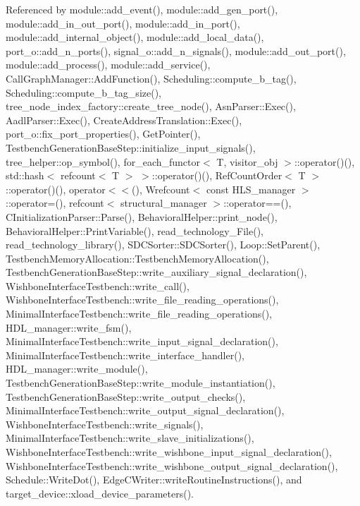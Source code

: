 Referenced by module\+::add\+\_\+event(), module\+::add\+\_\+gen\+\_\+port(), module\+::add\+\_\+in\+\_\+out\+\_\+port(), module\+::add\+\_\+in\+\_\+port(), module\+::add\+\_\+internal\+\_\+object(), module\+::add\+\_\+local\+\_\+data(), port\+\_\+o\+::add\+\_\+n\+\_\+ports(), signal\+\_\+o\+::add\+\_\+n\+\_\+signals(), module\+::add\+\_\+out\+\_\+port(), module\+::add\+\_\+process(), module\+::add\+\_\+service(), Call\+Graph\+Manager\+::\+Add\+Function(), Scheduling\+::compute\+\_\+b\+\_\+tag(), Scheduling\+::compute\+\_\+b\+\_\+tag\+\_\+size(), tree\+\_\+node\+\_\+index\+\_\+factory\+::create\+\_\+tree\+\_\+node(), Asn\+Parser\+::\+Exec(), Aadl\+Parser\+::\+Exec(), Create\+Address\+Translation\+::\+Exec(), port\+\_\+o\+::fix\+\_\+port\+\_\+properties(), Get\+Pointer(), Testbench\+Generation\+Base\+Step\+::initialize\+\_\+input\+\_\+signals(), tree\+\_\+helper\+::op\+\_\+symbol(), for\+\_\+each\+\_\+functor$<$ T, visitor\+\_\+obj $>$\+::operator()(), std\+::hash$<$ refcount$<$ T $>$ $>$\+::operator()(), Ref\+Count\+Order$<$ T $>$\+::operator()(), operator$<$$<$(), Wrefcount$<$ const H\+L\+S\+\_\+manager $>$\+::operator=(), refcount$<$ structural\+\_\+manager $>$\+::operator==(), C\+Initialization\+Parser\+::\+Parse(), Behavioral\+Helper\+::print\+\_\+node(), Behavioral\+Helper\+::\+Print\+Variable(), read\+\_\+technology\+\_\+\+File(), read\+\_\+technology\+\_\+library(), S\+D\+C\+Sorter\+::\+S\+D\+C\+Sorter(), Loop\+::\+Set\+Parent(), Testbench\+Memory\+Allocation\+::\+Testbench\+Memory\+Allocation(), Testbench\+Generation\+Base\+Step\+::write\+\_\+auxiliary\+\_\+signal\+\_\+declaration(), Wishbone\+Interface\+Testbench\+::write\+\_\+call(), Wishbone\+Interface\+Testbench\+::write\+\_\+file\+\_\+reading\+\_\+operations(), Minimal\+Interface\+Testbench\+::write\+\_\+file\+\_\+reading\+\_\+operations(), H\+D\+L\+\_\+manager\+::write\+\_\+fsm(), Minimal\+Interface\+Testbench\+::write\+\_\+input\+\_\+signal\+\_\+declaration(), Minimal\+Interface\+Testbench\+::write\+\_\+interface\+\_\+handler(), H\+D\+L\+\_\+manager\+::write\+\_\+module(), Testbench\+Generation\+Base\+Step\+::write\+\_\+module\+\_\+instantiation(), Testbench\+Generation\+Base\+Step\+::write\+\_\+output\+\_\+checks(), Minimal\+Interface\+Testbench\+::write\+\_\+output\+\_\+signal\+\_\+declaration(), Wishbone\+Interface\+Testbench\+::write\+\_\+signals(), Minimal\+Interface\+Testbench\+::write\+\_\+slave\+\_\+initializations(), Wishbone\+Interface\+Testbench\+::write\+\_\+wishbone\+\_\+input\+\_\+signal\+\_\+declaration(), Wishbone\+Interface\+Testbench\+::write\+\_\+wishbone\+\_\+output\+\_\+signal\+\_\+declaration(), Schedule\+::\+Write\+Dot(), Edge\+C\+Writer\+::write\+Routine\+Instructions(), and target\+\_\+device\+::xload\+\_\+device\+\_\+parameters().

